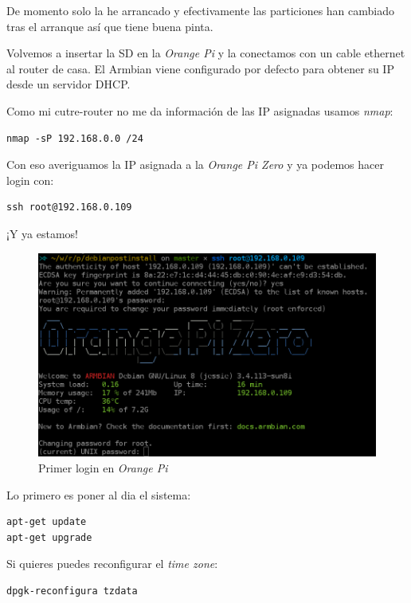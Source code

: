 \documentclass[12pt,spanish,]{article}
\begin{document}
De momento solo la he arrancado y efectivamente las particiones han
cambiado tras el arranque así que tiene buena pinta.

Volvemos a insertar la SD en la \emph{Orange Pi} y la conectamos con un
cable ethernet al router de casa. El Armbian viene configurado por
defecto para obtener su IP desde un servidor DHCP.

Como mi cutre-router no me da información de las IP asignadas usamos
\emph{nmap}:

\begin{verbatim}
nmap -sP 192.168.0.0 /24
\end{verbatim}

Con eso averiguamos la IP asignada a la \emph{Orange Pi Zero} y ya
podemos hacer login con:

\begin{verbatim}
ssh root@192.168.0.109
\end{verbatim}

¡Y ya estamos!

\begin{figure}[htbp]
\centering
\includegraphics{src/img/OrangePiZero_FirstLogin.png}
\caption{Primer login en \emph{Orange Pi}}
\end{figure}

Lo primero es poner al dia el sistema:

\begin{verbatim}
apt-get update
apt-get upgrade
\end{verbatim}

Si quieres puedes reconfigurar el \emph{time zone}:

\begin{verbatim}
dpgk-reconfigura tzdata
\end{verbatim}
\end{document}
